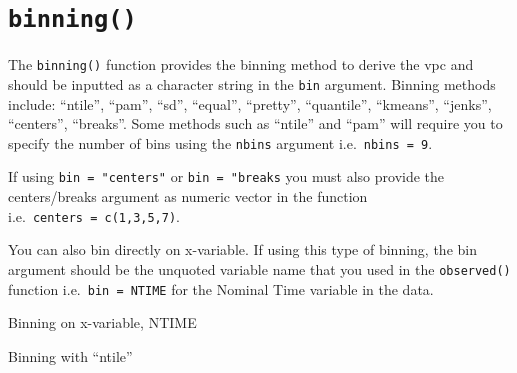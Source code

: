 \documentclass[
]{book}
\newenvironment{Shaded}{\begin{snugshade}}{\end{snugshade}}
\newcommand{\DataTypeTok}[1]{\textcolor[rgb]{0.13,0.29,0.53}{#1}}
\newcommand{\DecValTok}[1]{\textcolor[rgb]{0.00,0.00,0.81}{#1}}
\newcommand{\KeywordTok}[1]{\textcolor[rgb]{0.13,0.29,0.53}{\textbf{#1}}}
\newcommand{\NormalTok}[1]{#1}
\newcommand{\OperatorTok}[1]{\textcolor[rgb]{0.81,0.36,0.00}{\textbf{#1}}}
\newcommand{\StringTok}[1]{\textcolor[rgb]{0.31,0.60,0.02}{#1}}
\begin{document}
\hypertarget{binning}{%
\section{\texorpdfstring{\texttt{binning()}}{binning()}}\label{binning}}

The \texttt{binning()} function provides the binning method to derive the vpc and should be inputted as a character string in the \texttt{bin} argument. Binning methods include: ``ntile'', ``pam'', ``sd'', ``equal'', ``pretty'', ``quantile'', ``kmeans'', ``jenks'', ``centers'', ``breaks''. Some methods such as ``ntile'' and ``pam'' will require you to specify the number of bins using the \texttt{nbins} argument i.e.~\texttt{nbins\ =\ 9}.

If using \texttt{bin\ =\ "centers"} or \texttt{bin\ =\ "breaks} you must also provide the centers/breaks argument as numeric vector in the function i.e.~\texttt{centers\ =\ c(1,3,5,7)}.

You can also bin directly on x-variable. If using this type of binning, the bin argument should be the unquoted variable name that you used in the \texttt{observed()} function i.e.~\texttt{bin\ =\ NTIME} for the Nominal Time variable in the data.

Binning on x-variable, NTIME

\begin{Shaded}
\end{Shaded}

Binning with ``ntile''

\begin{Shaded}
\end{Shaded}
\end{document}
